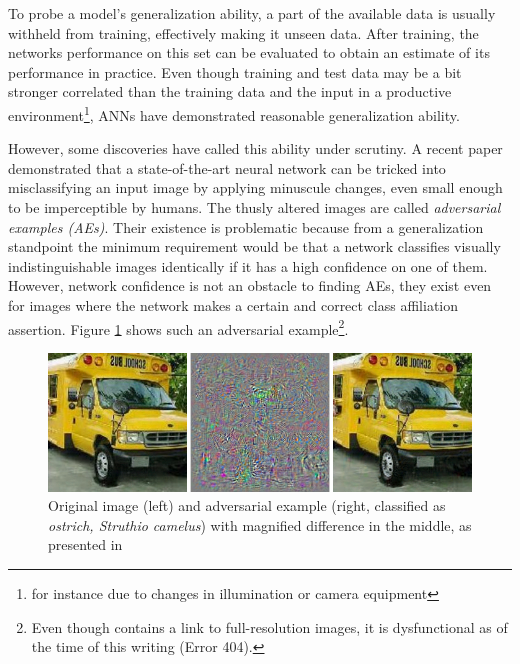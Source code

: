 \documentclass[11pt, a4paper]{article}
\begin{document}
To probe a model's generalization ability, a part of the available data is usually withheld from training, effectively making it unseen data. After training, the networks performance on this set can be evaluated to obtain an estimate of its performance in practice. Even though training and test data may be a bit stronger correlated than the training data and the input in a productive environment\footnote{for instance due to changes in illumination or camera equipment}, ANNs have demonstrated reasonable generalization ability.

However, some discoveries have called this ability under scrutiny. A recent paper \cite{intriguing-properties-of-neural-networks} demonstrated that a state-of-the-art neural network can be tricked into misclassifying an input image by applying minuscule changes, even small enough to be imperceptible by humans. The thusly altered images are called \emph{adversarial examples (AEs)}. Their existence is problematic because from a generalization standpoint the minimum requirement would be that a network classifies visually indistinguishable images identically if it has a high confidence on one of them. However, network confidence is not an obstacle to finding AEs, they exist even for images where the network makes a certain and correct class affiliation assertion. Figure \ref{fig:intriguing-properties-ae} shows such an adversarial example\footnote{Even though \cite{intriguing-properties-of-neural-networks} contains a link to full-resolution images, it is dysfunctional as of the time of this writing (Error 404).}.

\begin{figure}[h!tb]
\centering
	\includegraphics[width=\textwidth]{images/intruiging_properties_ae.png}
	\caption[Adversarial example from \cite{intriguing-properties-of-neural-networks}]{Original image (left) and adversarial example (right, classified as \emph{ostrich, Struthio
camelus}) with magnified difference in the middle, as presented in \cite{intriguing-properties-of-neural-networks}}
	\label{fig:intriguing-properties-ae}
\end{figure}
\end{document}
